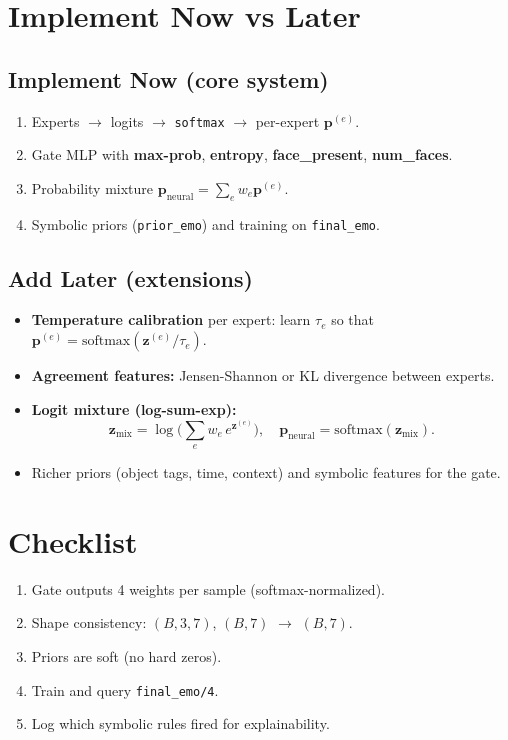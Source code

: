 \documentclass[12pt]{article}
\begin{document}
\section{Implement Now vs Later}
\subsection*{Implement Now (core system)}
\begin{enumerate}[leftmargin=1.2em]
  \item Experts $\to$ logits $\to$ \texttt{softmax} $\to$ per-expert $\bm{p}^{(e)}$.
  \item Gate MLP with \textbf{max-prob}, \textbf{entropy}, \textbf{face\_present}, \textbf{num\_faces}.
  \item Probability mixture $\bm{p}_{\text{neural}}=\sum_e w_e \bm{p}^{(e)}$.
  \item Symbolic priors (\texttt{prior\_emo}) and training on \texttt{final\_emo}.
\end{enumerate}

\subsection*{Add Later (extensions)}
\begin{itemize}[leftmargin=1.2em]
  \item \textbf{Temperature calibration} per expert: learn $\tau_e$ so that
    $\bm{p}^{(e)}=\mathrm{softmax}(\bm{z}^{(e)}/\tau_e)$.
  \item \textbf{Agreement features:} Jensen-Shannon or KL divergence between experts.
  \item \textbf{Logit mixture (log-sum-exp):}
  \[
  \bm{z}_{\text{mix}} = \log\!\Big(\sum_{e} w_e\,e^{\bm{z}^{(e)}}\Big),\quad
  \bm{p}_{\text{neural}}=\mathrm{softmax}(\bm{z}_{\text{mix}}).
  \]
  \item Richer priors (object tags, time, context) and symbolic features for the gate.
\end{itemize}

\section{Checklist}
\begin{enumerate}[leftmargin=1.2em]
  \item Gate outputs 4 weights per sample (softmax-normalized).
  \item Shape consistency: $(B,3,7)$, $(B,7)$ $\rightarrow$ $(B,7)$.
  \item Priors are soft (no hard zeros).
  \item Train and query \texttt{final\_emo/4}.
  \item Log which symbolic rules fired for explainability.
\end{enumerate}
\end{document}
